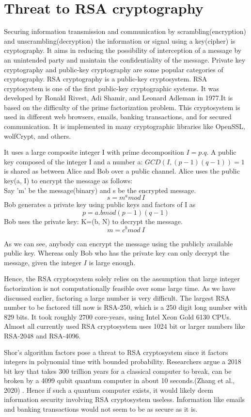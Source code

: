 \section[Cryptography]{Threat to RSA cryptography}
Securing information transmission and communication by scrambling(encryption) and unscrambling(decryption) the information or signal using a key(cipher) is cryptography. It aims in reducing the possibility of interception of a message by an unintended party and maintain the confidentiality of the message. Private key cryptography and public-key cryptography are some popular categories of cryptography. RSA cryptography is a public-key cryptosystem.
RSA cryptosystem is one of the first public-key cryptographic systems. It was developed by Ronald Rivest, Adi Shamir, and Leonard Adleman in 1977.\cite{chen20007}It is based on the difficulty of the prime factorization problem. This cryptosystem is used in different web browsers, emails, banking transactions, and for secured communication. It is implemented in many cryptographic libraries like OpenSSL, wolfCrypt, and others.

It uses a large composite integer I with prime decomposition $I=p.q$. A public key composed of the integer I and a number a: $GCD(I,(p-1)(q-1))=1$ is shared as between Alice and Bob over a public channel. Alice uses the public key(a, I) to encrypt the message as follows:
\\Say 'm' be the message(binary) and s be the encrypted message.
$$s=m^a mod\,I$$
Bob generates a private key using public keys and factors of I as
$$ p= a.b mod (p-1)(q-1)$$
Bob uses the private key: K=(b, N) to decrypt the message.
$$m= c^b mod\: I$$

As we can see, anybody can encrypt the message using the publicly available public key. Whereas only Bob who has the private key can only decrypt the message, given the integer $I$ is large enough.

Hence, the RSA cryptosystem solely relies on the assumption that large integer factorization is not computationally feasible over some large time. As we have discussed earlier, factoring a large number is very difficult. The largest RSA number to be factored till now is RSA-250, which is a 250 digit long number with 829 bits. It took roughly 2700 core-years, using Intel Xeon Gold 6130 CPUs.\cite{rsa250} Almost all currently used RSA cryptosystem uses 1024 bit or larger numbers like RSA-2048 and RSA-4096. 

Shor's algorithm factors pose a threat to RSA cryptosystem since it factors integers in polynomial time with bounded probability. Researchers argue a 2018 bit key that takes 300 trillion years for a classical computer to break, can be broken by a 4099 qubit quantum computer in about 10 seconds.(Zhang et al., 2020) \cite{zhang_miranskyy_rjaibi_2021}.  Hence if such a quantum computer exists, it would likely deem information security involving RSA cryptosystem useless. Information like emails and banking transactions would not seem to be as secure as it is.